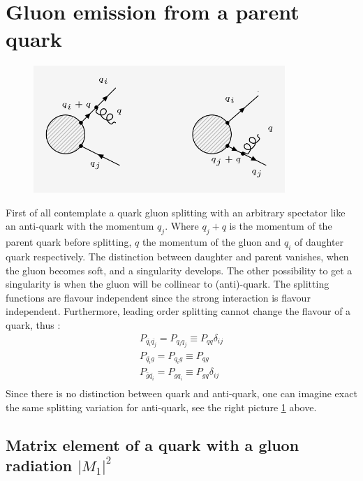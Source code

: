 \section{Gluon emission from a parent quark}
\label{fir}
\begin{figure}[ht!]
\centering
\includegraphics[width=0.85\textwidth]{images/QQ/qqg-diagrams.png}
\label{qg}
\end{figure}
First of all contemplate a quark gluon splitting with an arbitrary spectator like an anti-quark with the momentum $ q_j $. Where $ q_j+q $ is the momentum of the parent quark before splitting, $q$ the momentum of the gluon and $q_i$ of daughter quark respectively. The distinction between daughter and parent vanishes, when the gluon becomes soft,  and a
singularity develops. The other possibility to get a singularity is when the gluon will be collinear to (anti)-quark. The splitting functions are flavour independent since the strong interaction is flavour independent. Furthermore, leading order splitting cannot change the flavour of a quark, thus \cite{halzen1984quarks}:
\begin{equation}
\begin{split}
P_{{\bar{q_i}}{\bar{q_j}}}=P_{{q_i}{q_j}}\equiv P_{{q}{q}} \delta_{ij}\\
P_{{\bar{q_i}}{{g}}}=P_{{q_i}{g}}\equiv P_{{q}{g}} \\
P_{{\bar{g}}{\bar{q_i}}}=P_{{g}{q_i}}\equiv P_{{g}{q}} \delta_{ij}\\
\end{split}
\end{equation}
Since there is no distinction between quark and anti-quark, one can imagine exact the same splitting variation for anti-quark, see the right picture \ref{qg} above.


\pagebreak
\subsection{Matrix element of a quark with a gluon radiation $ |M_1|^2 $}

